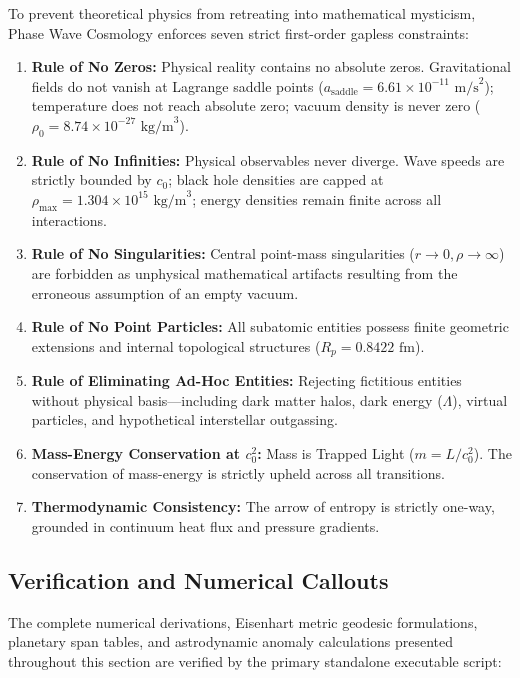\documentclass[11pt,a4paper]{article}
\begin{document}
To prevent theoretical physics from retreating into mathematical mysticism, Phase Wave Cosmology enforces seven strict first-order gapless constraints:
\begin{enumerate}
    \item \textbf{Rule of No Zeros:} Physical reality contains no absolute zeros. Gravitational fields do not vanish at Lagrange saddle points ($a_{\text{saddle}} = 6.61 \times 10^{-11}\text{ m/s}^2$); temperature does not reach absolute zero; vacuum density is never zero ($\rho_0 = 8.74 \times 10^{-27}\text{ kg/m}^3$).
    \item \textbf{Rule of No Infinities:} Physical observables never diverge. Wave speeds are strictly bounded by $c_0$; black hole densities are capped at $\rho_{\max} = 1.304 \times 10^{15}\text{ kg/m}^3$; energy densities remain finite across all interactions.
    \item \textbf{Rule of No Singularities:} Central point-mass singularities ($r \to 0, \rho \to \infty$) are forbidden as unphysical mathematical artifacts resulting from the erroneous assumption of an empty vacuum.
    \item \textbf{Rule of No Point Particles:} All subatomic entities possess finite geometric extensions and internal topological structures ($R_p = 0.8422\text{ fm}$).
    \item \textbf{Rule of Eliminating Ad-Hoc Entities:} Rejecting fictitious entities without physical basis---including dark matter halos, dark energy ($\Lambda$), virtual particles, and hypothetical interstellar outgassing.
    \item \textbf{Mass-Energy Conservation at $c_0^2$:} Mass is Trapped Light ($m = L/c_0^2$). The conservation of mass-energy is strictly upheld across all transitions.
    \item \textbf{Thermodynamic Consistency:} The arrow of entropy is strictly one-way, grounded in continuum heat flux and pressure gradients.
\end{enumerate}

\subsection{Verification and Numerical Callouts}
\label{subsec:section2_verification}

The complete numerical derivations, Eisenhart metric geodesic formulations, planetary span tables, and astrodynamic anomaly calculations presented throughout this section are verified by the primary standalone executable script:
\end{document}
